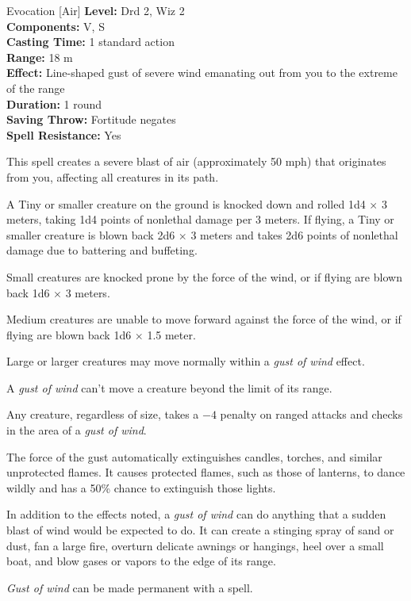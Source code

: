 {Evocation [Air]}
{
	\textbf{Level:}
	Drd 2, Wiz 2\\
	\textbf{Components:}
	V, S\\
	\textbf{Casting Time:}
	1 standard action\\
	\textbf{Range:}
	18 m\\
	\textbf{Effect:}
	Line-shaped gust of severe wind emanating out from you to the extreme of the range\\
	\textbf{Duration:}
	1 round\\
	\textbf{Saving Throw:}
	Fortitude negates\\
	\textbf{Spell Resistance:}
	Yes\\
}
{
	This spell creates a severe blast of air (approximately 50 mph) that originates from you, affecting all creatures in its path.

	A Tiny or smaller creature on the ground is knocked down and rolled 1d4 $\times$ 3 meters, taking 1d4 points of nonlethal damage per 3 meters. If flying, a Tiny or smaller creature is blown back 2d6 $\times$ 3 meters and takes 2d6 points of nonlethal damage due to battering and buffeting.

	Small creatures are knocked prone by the force of the wind, or if flying are blown back 1d6 $\times$ 3 meters.

	Medium creatures are unable to move forward against the force of the wind, or if flying are blown back 1d6 $\times$ 1.5 meter.

	Large or larger creatures may move normally within a \emph{gust of wind} effect.

	A \emph{gust of wind} can't move a creature beyond the limit of its range.

	Any creature, regardless of size, takes a $-4$ penalty on ranged attacks and  checks in the area of a \emph{gust of wind}.

	The force of the gust automatically extinguishes candles, torches, and similar unprotected flames. It causes protected flames, such as those of lanterns, to dance wildly and has a 50\% chance to extinguish those lights.

	In addition to the effects noted, a \emph{gust of wind} can do anything that a sudden blast of wind would be expected to do. It can create a stinging spray of sand or dust, fan a large fire, overturn delicate awnings or hangings, heel over a small boat, and blow gases or vapors to the edge of its range.

	\emph{Gust of wind} can be made permanent with a  spell.

}
